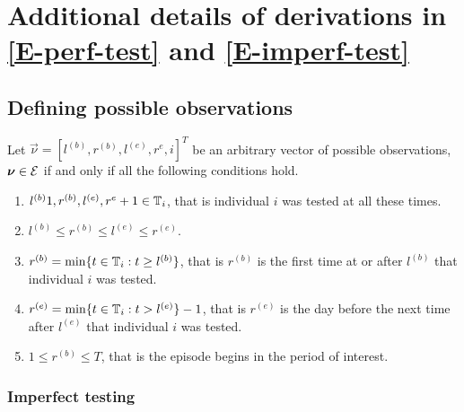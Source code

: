 \documentclass[thesis.tex]{subfiles}
\begin{document}
\chapter{Additional details of derivations in \cref{E-perf-test} and \cref{E-imperf-test}}

\section{Defining possible observations} \label{perf-test:sec:conditions-nu-E}

Let $\vec{\nu} = [l^{(b)}, r^{(b)}, l^{(e)}, r^{e}, i]^T$ be an arbitrary vector of possible observations, $\bm{\nu} \in \mathcal{E}$ if and only if all the following conditions hold.
\begin{enumerate}
  \item $l^{(b)} 1, r^{(b)}, l^{(e)}, r^{e} + 1 \in \mathbb{T}_{i}$, that is individual ${i}$ was tested at all these times.
  \item $l^{(b)} \leq r^{(b)} \leq l^{(e)} \leq r^{(e)}$.
  \item $r^{(b)} = \min\{t \in \mathbb{T}_{i} : t \geq l^{(b)}\}$, that is $r^{(b)}$ is the first time at or after $l^{(b)}$ that individual ${i}$ was tested.
  \item $r^{(e)} = \min\{t \in \mathbb{T}_{i} : t > l^{(e)}\} - 1$, that is $r^{(e)}$ is the day before the next time after $l^{(e)}$ that individual ${i}$ was tested.
  \item $1 \leq r^{(b)} \leq T$, that is the episode begins in the period of interest.
\end{enumerate}


\subsection{Imperfect testing}
\end{document}
